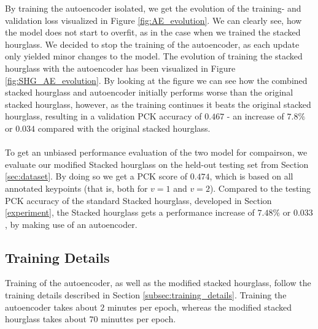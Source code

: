 \documentclass[./main.tex]{subfiles}
\begin{document}
\noindent By training the autoencoder isolated, we get the evolution of the training- and validation loss visualized in Figure \ref{fig:AE_evolution}. We can clearly see, how the model does not start to overfit, as in the case when we trained the stacked hourglass. We decided to stop the training of the autoencoder, as each update only yielded minor changes to the model. The evolution of training the stacked hourglass with the autoencoder has been visualized in Figure \ref{fig:SHG_AE_evolution}. By looking at the figure we can see how the combined stacked hourglass and autoencoder initially performs worse than the original stacked hourglass, however, as the training continues it beats the original stacked hourglass, resulting in a validation PCK accuracy of $0.467$ - an increase of $7.8\%$ or $0.034$ compared with the original stacked hourglass.
\\
\\
To get an unbiased performance evaluation of the two model for compairson, we evaluate our modified Stacked hourglass on the held-out testing set from Section \ref{sec:dataset}. By doing so we get a PCK score of $0.474$, which is based on all annotated keypoints (that is, both for $v = 1$ and $v = 2$). Compared to the testing PCK accuracy of the standard Stacked hourglass, developed in Section \ref{experiment}, the Stacked hourglass gets a performance increase of $7.48\%$ or $0.033$, by making use of an autoencoder.

\subsection{Training Details}\label{subsec:improv_train}
Training of the autoencoder, as well as the modified stacked hourglass, follow the training details described in Section \ref{subsec:training_details}. Training the autoencoder takes about $2$ minutes per epoch, whereas the modified stacked hourglass takes about $70$ minuttes per epoch.
\end{document}
